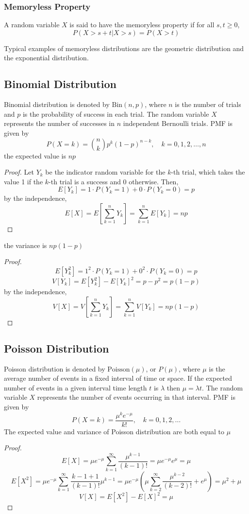 \documentclass{template}
\newcommand{\Poisson}{\text{Poisson}}
\newcommand{\Binomial}{\text{Bin}}
\begin{document}
\subsubsection{Memoryless Property}
A random variable \( X \) is said to have the memoryless property if for all \( s, t \geq 0 \),
\[
	P(X > s + t | X > s) = P(X > t)
\]

Typical examples of memoryless distributions are the geometric distribution and the exponential distribution.

\subsection{Binomial Distribution}
Binomial distribution is denoted by \( \Binomial(n, p) \), where \( n \) is the number of trials and \( p \) is the probability of success in each trial. The random variable \( X \) represents the number of successes in \( n \) independent Bernoulli trials.
PMF is given by
\[
	P(X=k) = \binom{n}{k} p^k (1-p)^{n-k}, \quad k=0,1,2,\ldots,n
\]
the expected value is $np$
\begin{proof}
	Let $Y_k$ be the indicator random variable for the $k$-th trial, which takes the
	value 1 if the $k$-th trial is a success and 0 otherwise. Then,
	 \[
		E[Y_k] = 1 \cdot P(Y_k=1) + 0 \cdot P(Y_k=0) = p
	\] 
	by the independence,
	\[
		E[X] = E\left[\sum_{k=1}^{n} Y_k\right] = \sum_{k=1}^{n} E[Y_k] = np
	\] 
\end{proof}
the variance is $np(1-p)$
\begin{proof}
	\[
		E[Y_k^2] = 1^2 \cdot P(Y_k=1) + 0^2 \cdot P(Y_k=0) = p
	\] 
	\[
		V[Y_k] = E[Y_k^2] - E[Y_k]^2 = p - p^2 = p(1-p)
	\] 
	by the independence,
	\[
		V[X] = V\left[\sum_{k=1}^{n} Y_k\right] = \sum_{k=1}^{n} V[Y_k] = np(1-p)
	\] 
\end{proof}

\subsection{Poisson Distribution}
Poisson distribution is denoted by \( \Poisson(\mu) \), or $P(\mu)$, where
 \( \mu \) is the average number of events in a fixed interval of time or space.
If the expected number of events in a given interval time length $t$ is $\lambda$
then $\mu=\lambda t$.
The random variable \( X \) represents the number of events occurring in that interval.
PMF is given by
\[
	P(X=k) = \frac{\mu^k e^{-\mu}}{k!}, \quad k=0,1,2,\ldots
\] 
The expected value and variance of Poisson distribution are both equal to \( \mu \)
\begin{proof}
\[
	E[X] = \mu e^{-\mu}\sum_{k=1}^{\infty} \frac{\mu^{k-1} }{(k-1)!} = 
	\mu e^{-\mu} e^{\mu} = \mu
\] 
\[
	E[X^2] = \mu e^{-\mu}\sum_{k=1}^{\infty} \frac{k-1+1}{(k-1)!} \mu^{k-1}
	= \mu e^{-\mu} \left( 
	\mu\sum_{k=2}^{\infty} \frac{\mu^{k-2}}{(k-2)!} + e^{\mu} \right)
	= \mu^2 + \mu
\] 
\[
	V[X] = E[X^2] - E[X]^2 = \mu
\] 
\end{proof}
\end{document}
